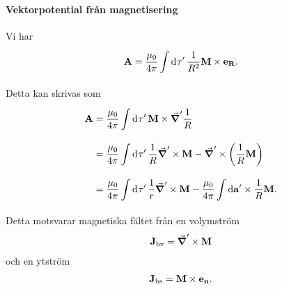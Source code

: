 \paragraph{Vektorpotential från magnetisering}
Vi har
\begin{align*}
	\vb{A} = \frac{\mu_{0}}{4\pi}\int\limits_{}^{}\dd[]{\tau'}\frac{1}{R^{2}}\vb{M}\times\vb{e}_{\vb{R}}.
\end{align*}
Detta kan skrivas som
\begin{align*}
	\vb{A} &= \frac{\mu_{0}}{4\pi}\int\limits_{}^{}\dd[]{\tau'}\vb{M}\times\grad^{\prime}{\frac{1}{R}} \\
	       &= \frac{\mu_{0}}{4\pi}\int\limits_{}^{}\dd[]{\tau'}\frac{1}{R}\grad^{\prime}\times{\vb{M}} - \grad^{\prime}\times{\left(\frac{1}{R}\vb{M}\right)} \\
	       &= \frac{\mu_{0}}{4\pi}\int\limits_{}^{}\dd[]{\tau'}\frac{1}{r}\grad^{\prime}\times{\vb{M}} - \frac{\mu_{0}}{4\pi}\int\limits_{}^{}\dd{\vb{a'}}\times \frac{1}{R}\vb{M}.
\end{align*}
Detta motsvarar magnetiska fältet från en volymström
\begin{align*}
	\vb{J}_{\text{bv}} = \grad^{\prime}\times{\vb{M}}
\end{align*}
och en ytström
\begin{align*}
	\vb{J}_{\text{bs}} = \vb{M}\times\vb{e}_{\vb{n}}.
\end{align*}

